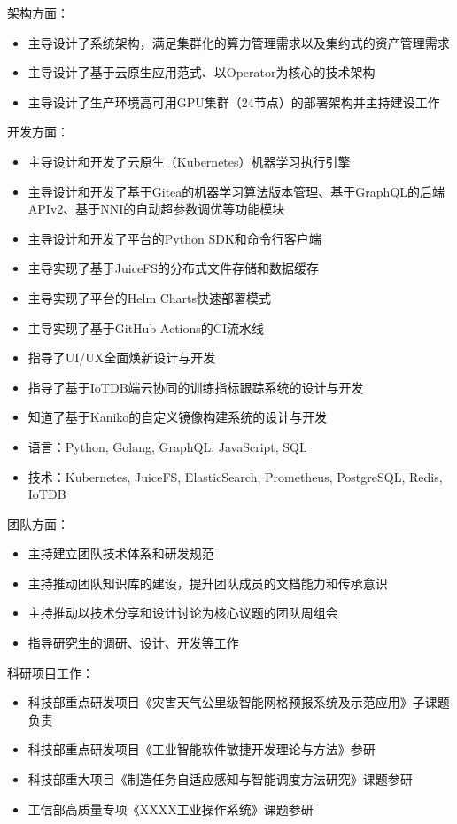 \documentclass[letterpaper]{twentysecondcv} %
\begin{document}
\begin{twentyfluid}
{{\begin{itemize}
    \end{itemize}
    架构方面：
    \vspace{-0.1cm}
    \begin{itemize}
        \item 主导设计了系统架构，满足集群化的算力管理需求以及集约式的资产管理需求
        \item 主导设计了基于云原生应用范式、以Operator为核心的技术架构
        \item 主导设计了生产环境高可用GPU集群（24节点）的部署架构并主持建设工作
    \end{itemize}
    开发方面：
    \vspace{-0.1cm}
    \begin{itemize}
        \item 主导设计和开发了云原生（Kubernetes）机器学习执行引擎
        \item 主导设计和开发了基于Gitea的机器学习算法版本管理、基于GraphQL的后端APIv2、基于NNI的自动超参数调优等功能模块
        \item 主导设计和开发了平台的Python SDK和命令行客户端
        \item 主导实现了基于JuiceFS的分布式文件存储和数据缓存
        \item 主导实现了平台的Helm Charts快速部署模式
        \item 主导实现了基于GitHub Actions的CI流水线
        \item 指导了UI/UX全面焕新设计与开发
        \item 指导了基于IoTDB端云协同的训练指标跟踪系统的设计与开发
        \item 知道了基于Kaniko的自定义镜像构建系统的设计与开发
        \item 语言：Python, Golang, GraphQL, JavaScript, SQL
        \item 技术：Kubernetes, JuiceFS, ElasticSearch, Prometheus, PostgreSQL, Redis, IoTDB
    \end{itemize}
    团队方面：
    \vspace{-0.1cm}
    \begin{itemize}
        \item 主持建立团队技术体系和研发规范
        \item 主持推动团队知识库的建设，提升团队成员的文档能力和传承意识
        \item 主持推动以技术分享和设计讨论为核心议题的团队周组会
        \item 指导研究生的调研、设计、开发等工作
    \end{itemize}
    科研项目工作：
    \vspace{-0.1cm}
    \begin{itemize}
        \item 科技部重点研发项目《灾害天气公里级智能网格预报系统及示范应用》子课题负责
        \item 科技部重点研发项目《工业智能软件敏捷开发理论与方法》参研
        \item 科技部重大项目《制造任务自适应感知与智能调度方法研究》课题参研
        \item 工信部高质量专项《XXXX工业操作系统》课题参研
    \end{itemize}
    }
    }
\end{twentyfluid}
\end{document}
